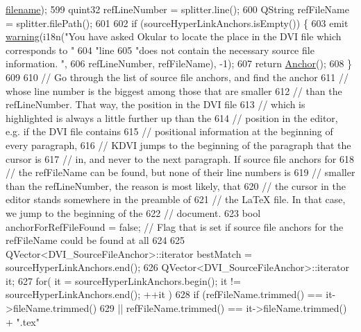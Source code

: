 \begin{DoxyCode}
      \hyperlink{classdvifile_a1c0fe420231e71f256b5db367b7e1178}{filename});
599     quint32 refLineNumber = splitter.line();
600     QString  refFileName   = splitter.filePath();
601 
602     \textcolor{keywordflow}{if} (sourceHyperLinkAnchors.isEmpty()) \{
603       emit \hyperlink{classdviRenderer_a07b2460ad76478aa074720e2fd4876bd}{warning}(i18n(\textcolor{stringliteral}{"You have asked Okular to locate the place in the DVI file which corresponds
       to "}
604                         \textcolor{stringliteral}{"line %
605                         \textcolor{stringliteral}{"does not contain the necessary source file information. "},
606                         refLineNumber, refFileName), -1);
607       \textcolor{keywordflow}{return} \hyperlink{classAnchor}{Anchor}();
608     \}
609 
610     \textcolor{comment}{// Go through the list of source file anchors, and find the anchor}
611     \textcolor{comment}{// whose line number is the biggest among those that are smaller}
612     \textcolor{comment}{// than the refLineNumber. That way, the position in the DVI file}
613     \textcolor{comment}{// which is highlighted is always a little further up than the}
614     \textcolor{comment}{// position in the editor, e.g. if the DVI file contains}
615     \textcolor{comment}{// positional information at the beginning of every paragraph,}
616     \textcolor{comment}{// KDVI jumps to the beginning of the paragraph that the cursor is}
617     \textcolor{comment}{// in, and never to the next paragraph. If source file anchors for}
618     \textcolor{comment}{// the refFileName can be found, but none of their line numbers is}
619     \textcolor{comment}{// smaller than the refLineNumber, the reason is most likely, that}
620     \textcolor{comment}{// the cursor in the editor stands somewhere in the preamble of}
621     \textcolor{comment}{// the LaTeX file. In that case, we jump to the beginning of the}
622     \textcolor{comment}{// document.}
623     \textcolor{keywordtype}{bool} anchorForRefFileFound = \textcolor{keyword}{false}; \textcolor{comment}{// Flag that is set if source file anchors for the refFileName
       could be found at all}
624 
625     QVector<DVI\_SourceFileAnchor>::iterator bestMatch = sourceHyperLinkAnchors.end();
626     QVector<DVI\_SourceFileAnchor>::iterator it;
627     \textcolor{keywordflow}{for}( it = sourceHyperLinkAnchors.begin(); it != sourceHyperLinkAnchors.end(); ++it )
628       \textcolor{keywordflow}{if} (refFileName.trimmed() == it->fileName.trimmed()
629       || refFileName.trimmed() == it->fileName.trimmed() + \textcolor{stringliteral}{".tex"}
}
\end{DoxyCode}
